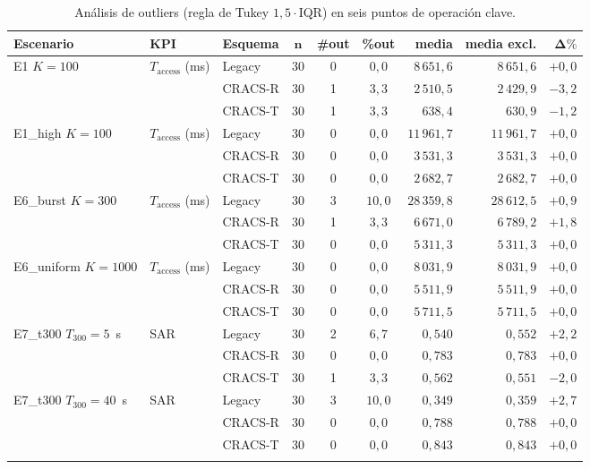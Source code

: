 \begin{table}[H]
\centering
\caption{Análisis de outliers (regla de Tukey $1{,}5\cdot$IQR) en seis puntos de operación clave.}
\label{tab:res_outliers}
\small
\renewcommand{\arraystretch}{1.1}
\begin{tabular}{@{}l l l c c c r r r@{}}
\toprule
\textbf{Escenario} & \textbf{KPI} & \textbf{Esquema} & $\boldsymbol{n}$ & \textbf{\#out} & \textbf{\%out} & \textbf{media} & \textbf{media excl.} & $\boldsymbol{\Delta\%}$ \\
\midrule
E1 $K{=}100$ & $T_{\text{access}}$ (ms) & Legacy & 30 & 0 & $0{,}0$ & $8\,651{,}6$ & $8\,651{,}6$ & $+0{,}0$ \\
 & & CRACS-R & 30 & 1 & $3{,}3$ & $2\,510{,}5$ & $2\,429{,}9$ & $-3{,}2$ \\
 & & CRACS-T & 30 & 1 & $3{,}3$ & $638{,}4$ & $630{,}9$ & $-1{,}2$ \\
\addlinespace[2pt]
E1\_high $K{=}100$ & $T_{\text{access}}$ (ms) & Legacy & 30 & 0 & $0{,}0$ & $11\,961{,}7$ & $11\,961{,}7$ & $+0{,}0$ \\
 & & CRACS-R & 30 & 0 & $0{,}0$ & $3\,531{,}3$ & $3\,531{,}3$ & $+0{,}0$ \\
 & & CRACS-T & 30 & 0 & $0{,}0$ & $2\,682{,}7$ & $2\,682{,}7$ & $+0{,}0$ \\
\addlinespace[2pt]
E6\_burst $K{=}300$ & $T_{\text{access}}$ (ms) & Legacy & 30 & 3 & $10{,}0$ & $28\,359{,}8$ & $28\,612{,}5$ & $+0{,}9$ \\
 & & CRACS-R & 30 & 1 & $3{,}3$ & $6\,671{,}0$ & $6\,789{,}2$ & $+1{,}8$ \\
 & & CRACS-T & 30 & 0 & $0{,}0$ & $5\,311{,}3$ & $5\,311{,}3$ & $+0{,}0$ \\
\addlinespace[2pt]
E6\_uniform $K{=}1000$ & $T_{\text{access}}$ (ms) & Legacy & 30 & 0 & $0{,}0$ & $8\,031{,}9$ & $8\,031{,}9$ & $+0{,}0$ \\
 & & CRACS-R & 30 & 0 & $0{,}0$ & $5\,511{,}9$ & $5\,511{,}9$ & $+0{,}0$ \\
 & & CRACS-T & 30 & 0 & $0{,}0$ & $5\,711{,}5$ & $5\,711{,}5$ & $+0{,}0$ \\
\addlinespace[2pt]
E7\_t300 $T_{300}{=}5$~s & SAR & Legacy & 30 & 2 & $6{,}7$ & $0{,}540$ & $0{,}552$ & $+2{,}2$ \\
 & & CRACS-R & 30 & 0 & $0{,}0$ & $0{,}783$ & $0{,}783$ & $+0{,}0$ \\
 & & CRACS-T & 30 & 1 & $3{,}3$ & $0{,}562$ & $0{,}551$ & $-2{,}0$ \\
\addlinespace[2pt]
E7\_t300 $T_{300}{=}40$~s & SAR & Legacy & 30 & 3 & $10{,}0$ & $0{,}349$ & $0{,}359$ & $+2{,}7$ \\
 & & CRACS-R & 30 & 0 & $0{,}0$ & $0{,}788$ & $0{,}788$ & $+0{,}0$ \\
 & & CRACS-T & 30 & 0 & $0{,}0$ & $0{,}843$ & $0{,}843$ & $+0{,}0$ \\
\addlinespace[2pt]
\bottomrule
\end{tabular}
\end{table}

